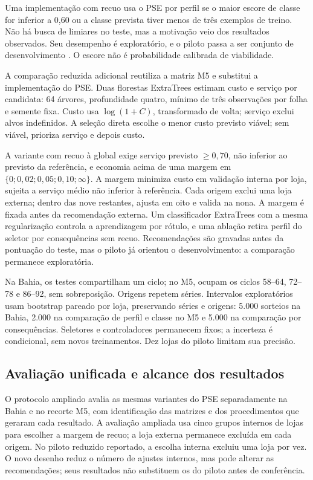 \documentclass[preprint,12pt]{elsarticle}
\begin{document}
Uma implementação com recuo usa o PSE por perfil se o maior escore de classe for inferior a 0,60 ou a classe prevista tiver menos de três exemplos de treino. Não há busca de limiares no teste, mas a motivação veio dos resultados observados. Seu desempenho é exploratório, e o piloto passa a ser conjunto de desenvolvimento \cite{CawleyTalbot2010}. O escore não é probabilidade calibrada de viabilidade.

A comparação reduzida adicional reutiliza a matriz M5 e substitui a implementação do PSE. Duas florestas ExtraTrees estimam custo e serviço por candidata: 64 árvores, profundidade quatro, mínimo de três observações por folha e semente fixa. Custo usa $\log(1+C)$, transformado de volta; serviço exclui alvos indefinidos. A seleção direta escolhe o menor custo previsto viável; sem viável, prioriza serviço e depois custo.

A variante com recuo à global exige serviço previsto $\geq0{,}70$, não inferior ao previsto da referência, e economia acima de uma margem em $\{0;0{,}02;0{,}05;0{,}10;\infty\}$. A margem minimiza custo em validação interna por loja, sujeita a serviço médio não inferior à referência. Cada origem exclui uma loja externa; dentro das nove restantes, ajusta em oito e valida na nona. A margem é fixada antes da recomendação externa. Um classificador ExtraTrees com a mesma regularização controla a aprendizagem por rótulo, e uma ablação retira perfil do seletor por consequências sem recuo. Recomendações são gravadas antes da pontuação do teste, mas o piloto já orientou o desenvolvimento: a comparação permanece exploratória.

Na Bahia, os testes compartilham um ciclo; no M5, ocupam os ciclos 58--64, 72--78 e 86--92, sem sobreposição. Origens repetem séries. Intervalos exploratórios usam bootstrap pareado por loja, preservando séries e origens: 5.000 sorteios na Bahia, 2.000 na comparação de perfil e classe no M5 e 5.000 na comparação por consequências. Seletores e controladores permanecem fixos; a incerteza é condicional, sem novos treinamentos. Dez lojas do piloto limitam sua precisão.

\subsection{Avaliação unificada e alcance dos resultados}
O protocolo ampliado avalia as mesmas variantes do PSE separadamente na Bahia e no recorte M5, com identificação das matrizes e dos procedimentos que geraram cada resultado. A avaliação ampliada usa cinco grupos internos de lojas para escolher a margem de recuo; a loja externa permanece excluída em cada origem. No piloto reduzido reportado, a escolha interna excluiu uma loja por vez. O novo desenho reduz o número de ajustes internos, mas pode alterar as recomendações; seus resultados não substituem os do piloto antes de conferência.
\end{document}
